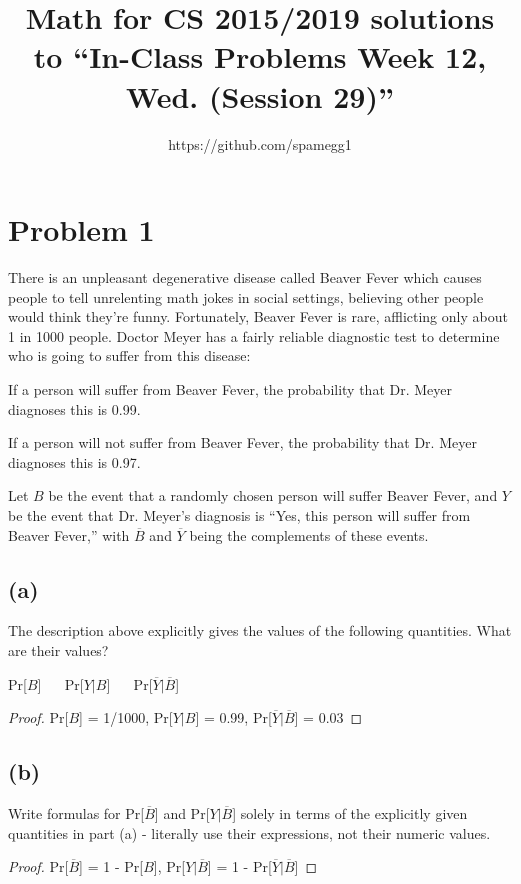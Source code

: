 \documentclass[14pt]{extarticle}
\title{Math for CS 2015/2019 solutions to ``In-Class Problems Week 12, Wed. (Session 29)''}
\author{https://github.com/spamegg1}
\begin{document}
\maketitle
\tableofcontents

\section{Problem 1}
There is an unpleasant degenerative disease called Beaver Fever which causes people to tell unrelenting math jokes in social settings, believing other people would think they’re funny. Fortunately, Beaver Fever is rare, afflicting only about 1 in 1000 people. Doctor Meyer has a fairly reliable diagnostic test to determine who is going to suffer from this disease:

If a person will suffer from Beaver Fever, the probability that Dr. Meyer diagnoses this is 0.99.

If a person will not suffer from Beaver Fever, the probability that Dr. Meyer diagnoses this is 0.97.

Let $B$ be the event that a randomly chosen person will suffer Beaver Fever, and $Y$ be the event that Dr. Meyer’s diagnosis is “Yes, this person will suffer from Beaver Fever,” with $\overline{B}$ and $\overline{Y}$ being the complements of these events.

\subsection{(a)}
The description above explicitly gives the values of the following quantities. What are their values?

Pr[$B$] \,\,\,\,\,\, Pr[$Y | B$] \,\,\,\,\,\, Pr[$\overline{Y} | \overline{B}$]
\begin{proof}
Pr[$B$] = 1/1000, Pr[$Y | B$] = 0.99, Pr[$\overline{Y} | \overline{B}$] = 0.03
\end{proof}

\subsection{(b)}
Write formulas for Pr[$\overline{B}$] and Pr[$Y | \overline{B}$] solely in terms of the explicitly given quantities in part (a) - literally use their expressions, not their numeric values.
\begin{proof}
Pr[$\overline{B}$] = 1 - Pr[$B$], Pr[$Y | \overline{B}$] = 1 - Pr[$\overline{Y} | \overline{B}$]
\end{proof}
\end{document}
